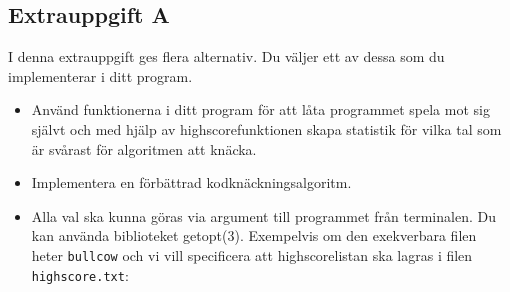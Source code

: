 \documentclass[a4paper]{miunasgn}
\theoremstyle{definition}
\begin{document}
\subsection{Extrauppgift A}
\noindent
I denna extrauppgift ges flera alternativ.
Du väljer ett av dessa som du implementerar i ditt program.
\begin{itemize}
	\item Använd funktionerna i ditt program för att låta programmet spela mot 
		sig självt och med hjälp av highscorefunktionen skapa statistik för vilka 
		tal som är svårast för algoritmen att knäcka.
	\item Implementera en förbättrad kodknäckningsalgoritm.
	\item Alla val ska kunna göras via argument till programmet från terminalen.
		Du kan använda biblioteket getopt(3).
		Exempelvis om den exekverbara filen heter \texttt{bullcow} och vi vill 
		specificera att highscorelistan ska lagras i filen \texttt{highscore.txt}:
\end{itemize}






\end{document}

